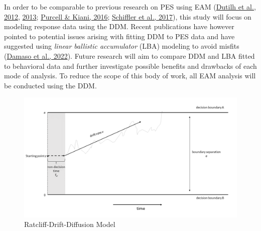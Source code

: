 \documentclass[
  man,floatsintext]{apa7}
\begin{document}
In order to be comparable to previous research on PES using EAM (\protect\hyperlink{ref-dutilh2012testing}{Dutilh et al., 2012}, \protect\hyperlink{ref-dutilh2013}{2013}; \protect\hyperlink{ref-purcell2016}{Purcell \& Kiani, 2016}; \protect\hyperlink{ref-schiffler2017}{Schiffler et al., 2017}), this study will focus on modeling response data using the DDM. Recent publications have however pointed to potential issues arising with fitting DDM to PES data and have suggested using \emph{linear ballistic accumulator} (LBA) modeling to avoid misfits (\protect\hyperlink{ref-damaso2022}{Damaso et al., 2022}). Future research will aim to compare DDM and LBA fitted to behavioral data and further investigate possible benefits and drawbacks of each mode of analysis. To reduce the scope of this body of work, all EAM analysis will be conducted using the DDM.



\begin{figure}
\centering
\includegraphics{images/ddm-slide/Slide1.png}
\caption{\label{fig:ddm-slide}Ratcliff-Drift-Diffusion Model}
\end{figure}
\end{document}
